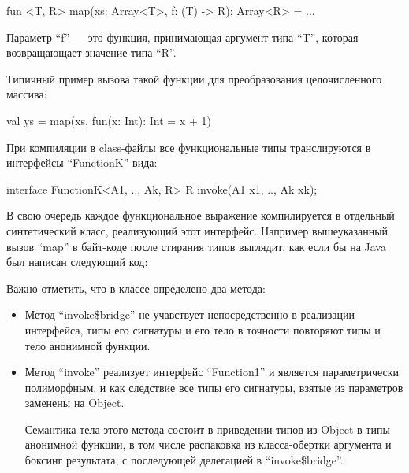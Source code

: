 \begin{pyglist}[language=kotlin]
fun <T, R> map(xs: Array<T>, f: (T) -> R): Array<R> = ...
\end{pyglist}

Параметр ``f'' --- это функция, принимающая аргумент типа ``T'', которая возвращающает значение
типа ``R''.

Типичный пример вызова такой функции для преобразования целочисленного массива:
\begin{pyglist}[language=kotlin]
    val ys = map(xs, fun(x: Int): Int = x + 1)
\end{pyglist}

При компиляции в class-файлы все функциональные типы транслируются в интерфейсы ``FunctionK''
вида:
\begin{pyglist}[language=java]
interface FunctionK<A1, .., Ak, R> {
    R invoke(A1 x1, .., Ak xk);
}
\end{pyglist}

В свою очередь каждое функциональное выражение компилируется в отдельный синтетический класс,
реализующий этот интерфейс. Например вышеуказанный вызов ``map'' в байт-коде после стирания типов
выглядит, как если бы на Java был написан следующий код:

Важно отметить, что в классе определено два метода:
\begin{itemize}
    \item Метод ``invoke\$bridge'' не учавствует непосредственно в реализации интерфейса, типы его
    сигнатуры и его тело в точности повторяют типы и тело анонимной функции.

    \item Метод ``invoke'' реализует интерфейс ``Function1'' и является параметрически полиморфным,
    и как следствие все типы его сигнатуры, взятые из параметров заменены на Object.

    Семантика тела этого метода состоит в приведении типов из Object в типы анонимной функции,
    в том числе распаковка из класса-обертки аргумента и боксинг результата, с последующей
    делегацией в ``invoke\$bridge''.
\end{itemize}
